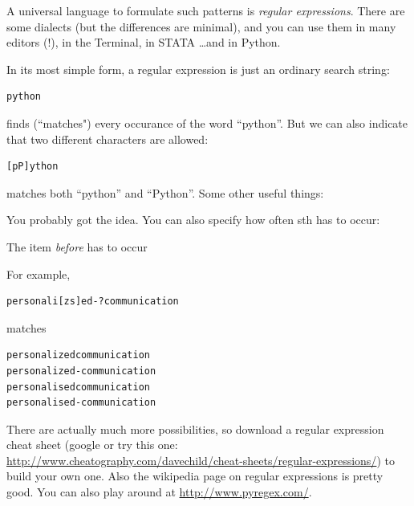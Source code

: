 \documentclass[a4paper,12pt]{book}
\renewcommand{\texttt}[1]{%
  \begingroup
  \ttfamily
  \begingroup\lccode`~=`/\lowercase{\endgroup\def~}{/\discretionary{}{}{}}%
  \begingroup\lccode`~=`[\lowercase{\endgroup\def~}{[\discretionary{}{}{}}%
  \begingroup\lccode`~=`.\lowercase{\endgroup\def~}{.\discretionary{}{}{}}%
  \begingroup\lccode`~=`(\lowercase{\endgroup\def~}{(\discretionary{}{}{}}%
  \catcode`/=\active\catcode`[=\active\catcode`.=\active\catcode`(=\active
  \scantokens{#1\noexpand}%
  \endgroup
}
\begin{document}
A universal language to formulate such patterns is \emph{regular expressions}. There are some dialects (but the differences are minimal), and you can use them in many editors (!), in the Terminal, in STATA \ldots and in Python.

In its most simple form, a regular expression is just an ordinary search string:
\begin{lstlisting}
python
\end{lstlisting}
finds (``matches") every occurance of the word ``python''. But we can also indicate that two different characters are allowed:
\begin{lstlisting}
[pP]ython
\end{lstlisting}
matches both ``python'' and ``Python''. Some other useful things:


You probably got the idea. You can also specify how often sth has to occur:

The item \emph{before} has to occur
For example,
\begin{lstlisting}
personali[zs]ed-?communication
\end{lstlisting}
matches 
\begin{lstlisting}
personalizedcommunication
personalized-communication
personalisedcommunication
personalised-communication
\end{lstlisting}


There are actually much more possibilities, so download a regular expression cheat sheet (google or try this one: \url{http://www.cheatography.com/davechild/cheat-sheets/regular-expressions/}) to build your own one. Also the wikipedia page on regular expressions is pretty good. You can also play around at \url{http://www.pyregex.com/}.
\end{document}
